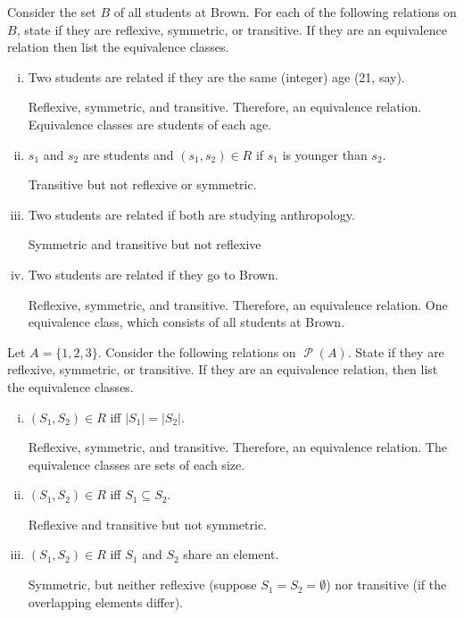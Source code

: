 \documentclass[12pt,letterpaper]{article}
\newcommand\Pow{\ensuremath{\operatorname{\mathcal{P}}}}
\begin{document}
    \begin{mdframed}
    		\item Consider the set $B$ of all students at Brown. For each of the following relations on $B$, state if they are reflexive, symmetric, or transitive. If they are an equivalence relation then list the equivalence classes.

		\begin{enumerate}[i.]
			\item Two students are related if they are the same (integer) age (21, say).


			Reflexive, symmetric, and transitive. Therefore, an equivalence relation. Equivalence classes are students of each age.

			\item$s_1$ and $s_2$ are students and $(s_1,s_2) \in R$ if $s_1$ is younger than $s_2$.

			Transitive but not reflexive or symmetric.

		\item Two students are related if both are studying anthropology.
		
				Symmetric and transitive but not reflexive


	  	\item Two students are related if they go to Brown.


			Reflexive, symmetric, and transitive. Therefore, an equivalence relation. One equivalence class, which consists of all students at Brown.
	
		\end{enumerate}

		\item Let $A = \{1,2,3\}$. Consider the following relations on $\Pow{(A)}$. State if they are reflexive, symmetric, or transitive. If they are an equivalence relation, then list the equivalence classes.

		\begin{enumerate}[i.]
			\item $(S_1,S_2) \in R$ iff $|S_1| = |S_2|$.

			Reflexive, symmetric, and transitive. Therefore, an equivalence relation. The equivalence classes are sets of each size.

			\item $(S_1,S_2) \in R$ iff $S_1 \subseteq S_2$.

			Reflexive and transitive but not symmetric. 

			\item $(S_1,S_2) \in R$ iff $S_1$ and $S_2$ share an element.


			Symmetric, but neither reflexive (suppose $S_1 = S_2 = \emptyset$) nor transitive (if the overlapping elements differ).
	
		\end{enumerate}

    \end{mdframed}
\end{document}
